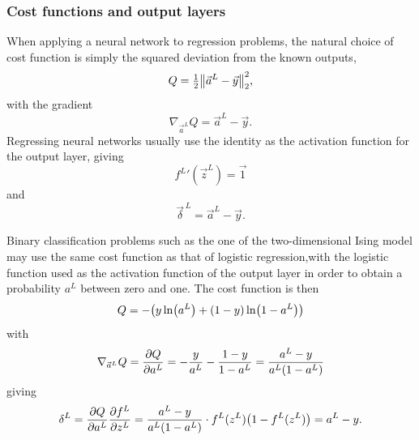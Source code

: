 \documentclass[11pt,british,a4paper]{article}
\numberwithin{equation}{section}
\begin{document}
\subsubsection{Cost functions and output layers}
When applying a neural network to regression problems, the natural choice of cost function is simply the squared deviation from the known outputs,
\begin{equation}
    Q = \tfrac{1}{2}\norm{\vec{a}^L - \vec{y}}_2^2,
\end{equation}
with the gradient
\begin{equation}
    \nabla_{\vec{a}^L} Q = \vec{a}^L - \vec{y}.
\end{equation}
Regressing neural networks usually use the identity as the activation function for the output layer, giving
\begin{equation}
    {f^L}'(\vec{z}^L) = \vec{1}
\end{equation}
and
\begin{equation}
    \vec{\delta}^{\,L} = \vec{a}^L - \vec{y}.
\end{equation}

Binary classification problems such as the one of the two-dimensional Ising model may use the same cost function as that of logistic regression,with the logistic function used as the activation function of the output layer in order to obtain a probability \(a^L\) between zero and one.
The cost function is then
\begin{equation}
    Q = -\qty(y\ln(a^L) + (1 - y)\ln(1-a^L))
\end{equation}
with
\begin{equation}
    \nabla_{\vec{a}^L} Q = \pdv{Q}{a^L} = -\frac{y}{a^L} - \frac{1-y}{1-a^L}
                         = \frac{a^L - y}{a^L\qty(1-a^L)}
\end{equation}
giving
\begin{equation}
    \delta^L = \pdv{Q}{a^L} \pdv{f^L}{z^L}
             = \frac{a^L - y}{a^L\qty(1-a^L)} \cdot f^L(z^L)\qty(1-f^L(z^L))
             = a^L - y.
\end{equation}



\end{document}
